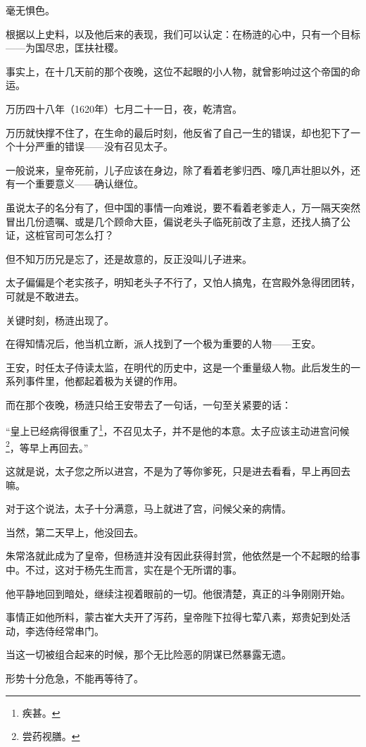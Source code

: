 \begin{multicols}{\theparacolNo}
		毫无惧色。

		根据以上史料，以及他后来的表现，我们可以认定：在杨涟的心中，只有一个目标——为国尽忠，匡扶社稷。

		事实上，在十几天前的那个夜晚，这位不起眼的小人物，就曾影响过这个帝国的命运。

		万历四十八年（1620年）七月二十一日，夜，乾清宫。

		万历就快撑不住了，在生命的最后时刻，他反省了自己一生的错误，却也犯下了一个十分严重的错误——没有召见太子。

		一般说来，皇帝死前，儿子应该在身边，除了看着老爹归西、嚎几声壮胆以外，还有一个重要意义——确认继位。

		虽说太子的名分有了，但中国的事情一向难说，要不看着老爹走人，万一隔天突然冒出几份遗嘱、或是几个顾命大臣，偏说老头子临死前改了主意，还找人搞了公证，这桩官司可怎么打？

		但不知万历兄是忘了，还是故意的，反正没叫儿子进来。

		太子偏偏是个老实孩子，明知老头子不行了，又怕人搞鬼，在宫殿外急得团团转，可就是不敢进去。

		关键时刻，杨涟出现了。

		在得知情况后，他当机立断，派人找到了一个极为重要的人物——王安。

		王安，时任太子侍读太监，在明代的历史中，这是一个重量级人物。此后发生的一系列事件里，他都起着极为关键的作用。

		而在那个夜晚，杨涟只给王安带去了一句话，一句至关紧要的话：

		“皇上已经病得很重了\footnote{疾甚。}，不召见太子，并不是他的本意。太子应该主动进宫问候\footnote{尝药视膳。}，等早上再回去。”

		这就是说，太子您之所以进宫，不是为了等你爹死，只是进去看看，早上再回去嘛。

		对于这个说法，太子十分满意，马上就进了宫，问候父亲的病情。

		当然，第二天早上，他没回去。

		朱常洛就此成为了皇帝，但杨涟并没有因此获得封赏，他依然是一个不起眼的给事中。不过，这对于杨先生而言，实在是个无所谓的事。

		他平静地回到暗处，继续注视着眼前的一切。他很清楚，真正的斗争刚刚开始。

		事情正如他所料，蒙古崔大夫开了泻药，皇帝陛下拉得七荤八素，郑贵妃到处活动，李选侍经常串门。

		当这一切被组合起来的时候，那个无比险恶的阴谋已然暴露无遗。

		形势十分危急，不能再等待了。


\end{multicols}
